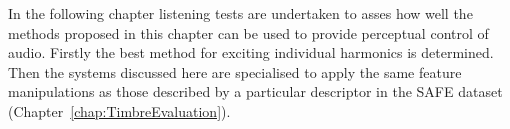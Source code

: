 	In the following chapter listening tests are undertaken to asses how well the methods proposed in this chapter can
	be used to provide perceptual control of audio. Firstly the best method for exciting individual harmonics is
	determined. Then the systems discussed here are specialised to apply the same feature manipulations as those
	described by a particular descriptor in the SAFE dataset (Chapter~\ref{chap:TimbreEvaluation}).

